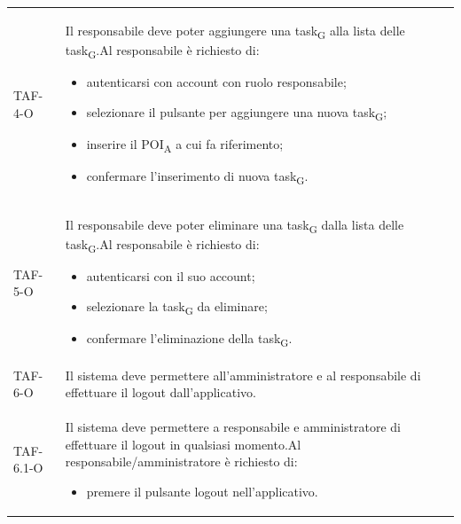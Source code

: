 \begin{longtable}{ >{\centering}p{} >{}p{}}
	TAF-4-O & Il responsabile deve poter aggiungere una task\textsubscript{G} alla lista delle task\textsubscript{G}.\newline Al responsabile è richiesto di: \begin{itemize}\item autenticarsi con account con ruolo responsabile; \item selezionare il pulsante per aggiungere una nuova task\textsubscript{G}; \item inserire il POI\textsubscript{A} a cui fa riferimento; \item confermare l'inserimento di nuova task\textsubscript{G}. \end{itemize}\tabularnewline

	

	TAF-5-O & Il responsabile deve poter eliminare una task\textsubscript{G} dalla lista delle task\textsubscript{G}.\newline Al responsabile è richiesto di: \begin{itemize} \item autenticarsi con il suo account; \item selezionare la task\textsubscript{G} da eliminare; \item confermare l'eliminazione della task\textsubscript{G}. \end{itemize}\tabularnewline

	TAF-6-O & Il sistema deve permettere all'amministratore e al responsabile di effettuare il logout dall'applicativo.\tabularnewline
	TAF-6.1-O & Il sistema deve permettere a responsabile e amministratore di effettuare il logout in qualsiasi momento.\newline Al responsabile/amministratore è richiesto di: \begin{itemize} \item premere il pulsante logout nell'applicativo. \end{itemize}\tabularnewline


\end{longtable}
